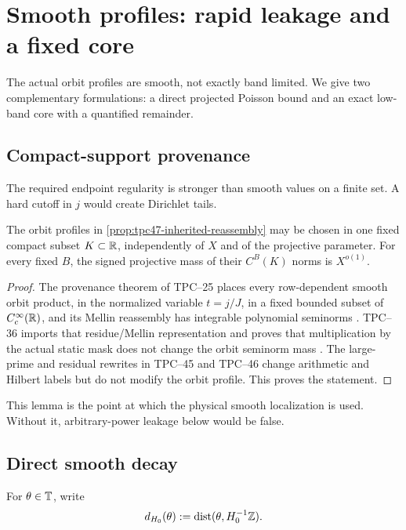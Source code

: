\section{Smooth profiles: rapid leakage and a fixed core}
\label{sec:tpc47-smooth-transfer}

The actual orbit profiles are smooth, not exactly band limited.  We
give two complementary formulations: a direct projected Poisson bound
and an exact low-band core with a quantified remainder.

\subsection{Compact-support provenance}

The required endpoint regularity is stronger than smooth values on a
finite set.  A hard cutoff in \(j\) would create Dirichlet tails.

\begin{lemma}
\label{lem:tpc47-common-orbit-support}
The orbit profiles in
\cref{prop:tpc47-inherited-reassembly} may be chosen in one fixed
compact subset \(K\subset\mathbb R\), independently of \(X\) and of the
projective parameter.  For every fixed \(B\), the signed projective
mass of their \(C^B(K)\) norms is \(X^{o(1)}\).
\end{lemma}

\begin{proof}
The provenance theorem of TPC--25 places every row-dependent smooth
orbit product, in the normalized variable \(t=j/J\), in a fixed
bounded subset of \(C_c^\infty(\mathbb R)\), and its Mellin reassembly has
integrable polynomial seminorms \citep{WangTPC25}.  TPC--36 imports
that residue/Mellin representation and proves that multiplication by
the actual static mask does not change the orbit seminorm mass
\citep{WangTPC36}.  The large-prime and residual rewrites in TPC--45
and TPC--46 change arithmetic and Hilbert labels but do not modify the
orbit profile.  This proves the statement.
\end{proof}

This lemma is the point at which the physical smooth localization is
used.  Without it, arbitrary-power leakage below would be false.

\subsection{Direct smooth decay}

For \(\theta\in\mathbb T\), write
\begin{equation}
 d_{H_0}(\theta)
 :=\operatorname{dist}(\theta,H_0^{-1}\mathbb Z).
 \label{eq:tpc47-subgroup-distance}
\end{equation}

